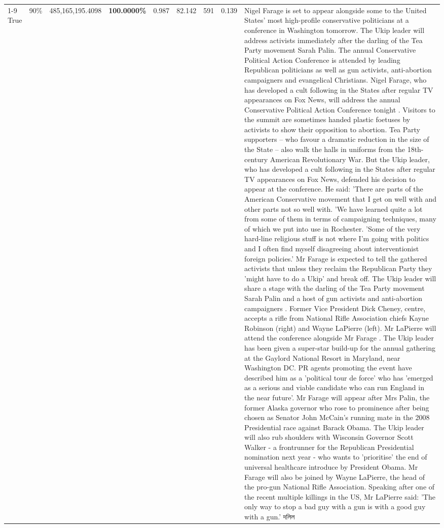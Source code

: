 \begin{table}[H]
\begin{tabular}{lllrlllll}
\cline{1-9} \cline{2-9}
True & 90\% & 485,165,195.4098 & \bfseries \color{red} 100.0000\% & 0.987 & 82.142 & 591 & 0.139 & Nigel Farage is set to appear alongside some to the United States' most high-profile conservative politicians at a conference in Washington tomorrow. The Ukip leader will address activists immediately after the darling of the Tea Party movement Sarah Palin. The annual Conservative Political Action Conference is attended by leading Republican politicians as well as gun activists, anti-abortion campaigners and evangelical Christians. Nigel Farage, who has developed a cult following in the States after regular TV appearances on Fox News, will address the annual Conservative Political Action Conference tonight . Visitors to the summit are sometimes handed plastic foetuses by activists to show their opposition to abortion. Tea Party supporters – who favour a dramatic reduction in the size of the State – also walk the halls in uniforms from the 18th-century American Revolutionary War. But the Ukip leader, who has developed a cult following in the States after regular TV appearances on Fox News, defended his decision to appear at the conference. He said: 'There are parts of the American Conservative movement that I get on well with and other parts not so well with. 'We have learned quite a lot from some of them in terms of campaigning techniques, many of which we put into use in Rochester. 'Some of the very hard-line religious stuff is not where I'm going with politics and I often find myself disagreeing about interventionist foreign policies.' Mr Farage is expected to tell the gathered activists that unless they reclaim the Republican Party they 'might have to do a Ukip' and break off. The Ukip leader will share a stage with the darling of the Tea Party movement Sarah Palin and a host of gun activists and anti-abortion campaigners . Former Vice President Dick Cheney, centre, accepts a rifle from National Rifle Association chiefs Kayne Robinson (right) and Wayne LaPierre (left). Mr LaPierre will attend the conference alongside Mr Farage . The Ukip leader has been given a super-star build-up for the annual gathering at the Gaylord National Resort in Maryland, near Washington DC. PR agents promoting the event have described him as a 'political tour de force' who has 'emerged as a serious and viable candidate who can run England in the near future'. Mr Farage will appear after Mrs Palin, the former Alaska governor who rose to prominence after being chosen as Senator John McCain's running mate in the 2008 Presidential race against Barack Obama. The Ukip leader will also rub shoulders with Wisconsin Governor Scott Walker - a frontrunner for the Republican Presidential nomination next year - who wants to 'prioritise' the end of universal healthcare introduce by President Obama. Mr Farage will also be joined by Wayne LaPierre, the head of the pro-gun National Rifle Association. Speaking after one of the recent multiple killings in the US, Mr LaPierre said: 'The only way to stop a bad guy with a gun is with a good guy with a gun.' দলিল \\

\end{tabular}
\end{table}
